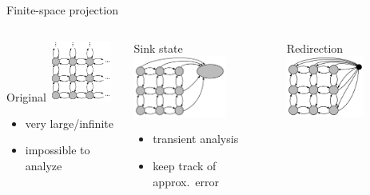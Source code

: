 \documentclass[9pt]{beamer}
\begin{document}
\begin{frame}{Finite-space projection}
    \begin{columns}
        \begin{column}{.30\textwidth}
            \begin{block}{Original}
                \centering
                \vspace{3mm}
                \includegraphics[height=2cm]{../gfx/state_space_untrunc.pdf}
                {\small
                \begin{itemize}
                    \item very large/infinite
                    \item impossible to analyze
                \end{itemize}
                }
            \end{block}
        \end{column}
        \begin{column}{.30\textwidth}
            \begin{block}{Sink state}
                \centering
                \vspace{3mm}
                \includegraphics[height=2cm]{../gfx/state_space_redirected.pdf}
                {\small
                \begin{itemize}
                    \item transient analysis
                    \item keep track of approx.\ error
                \end{itemize}
                }
            \end{block}
        \end{column}
        \begin{column}{.30\textwidth}
            \begin{block}{Redirection}
                \centering
                \vspace{3mm}
                \includegraphics[height=2cm]{../gfx/state_space_reentry.pdf}

\end{block}
\end{column}
\end{columns}
\end{frame}
\end{document}
